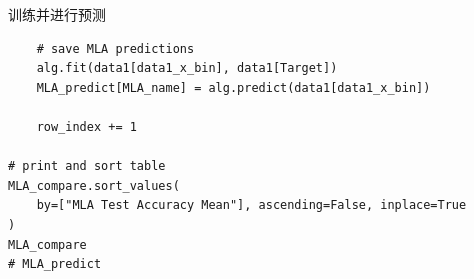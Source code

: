 \documentclass{beamer}
\begin{document}
\begin{frame}[fragile]{训练并进行预测}
\begin{verbatim}
    # save MLA predictions
    alg.fit(data1[data1_x_bin], data1[Target])
    MLA_predict[MLA_name] = alg.predict(data1[data1_x_bin])

    row_index += 1

# print and sort table
MLA_compare.sort_values(
    by=["MLA Test Accuracy Mean"], ascending=False, inplace=True
)
MLA_compare
# MLA_predict
	\end{verbatim}
\end{frame}
\end{document}
